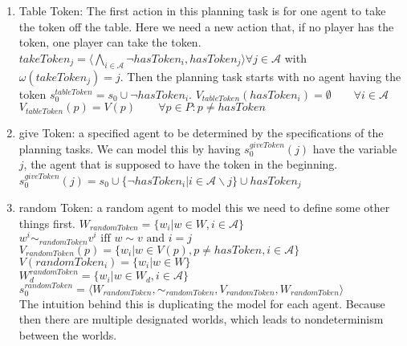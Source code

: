 \begin{enumerate}
  \item Table Token:
    The first action in this planning task is for one agent to take the token off the table. Here we need a new action that, if no player has the token, one player can take the token.\\
    $takeToken_j=\langle \bigwedge\limits_{i \in \mathcal{A}}
    \neg hasToken_i, hasToken_j \rangle \forall j \in \mathcal{A}$ with $\omega(takeToken_j)=j$. Then the planning task starts with no agent having the token
    $s_0^{tableToken} = s_0 \cup \neg hasToken_i$.
    $V_{tableToken}(hasToken_i)=\emptyset \qquad \forall i\in \mathcal{A}$\\
    $V_{tableToken}(p)=V(p) \qquad \forall p\in P : p \not = hasToken$

  \item give Token:
    a specified agent to be determined by the specifications of the planning tasks. We can model this by having $s_0^{giveToken}(j)$ have the variable $j$, the agent that is supposed to have the token in the beginning.
     $s_0^{giveToken}(j) = s_0 \cup \{\neg hasToken_i|i \in \mathcal{A} \backslash j\} \cup hasToken_j$

  \item random Token:
    a random agent
    to model this we need to define some other things first.
    $W_{randomToken}=\{w_i|w \in W, i\in \mathcal{A}\}$ \\
    $w^i \sim_{randomToken} v^i \text{ iff } w \sim v \text{ and } i=j$ \\
    $V_{randomToken}(p)=\{w_i|w\in V(p), p \not = hasToken, i\in \mathcal{A}\}$ \\
    $V(randomToken_i)=\{w_i|w \in W\}$ \\
    $W^{randomToken}_d=\{w_i|w\in W_d, i\in \mathcal{A}\}$ \\
    $s_0^{randomToken}=\langle W_{randomToken}, \sim_{randomToken}, V_{randomToken}, W_{randomToken} \rangle$ \\
    The intuition behind this is duplicating the model for each agent. Because then there are multiple designated worlds, which leads to nondeterminism between the worlds.
\end{enumerate}



